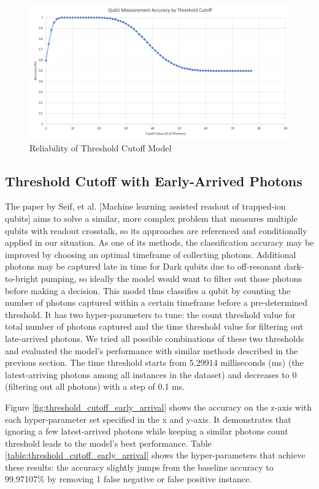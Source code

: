 \documentclass[letterpaper,twocolumn,10pt]{article}
\begin{document}
\begin{figure}
    \includegraphics[width=\linewidth]{Figures/threshold_cutoff_accuracy.png}
    \centering
    \caption{Reliability of Threshold Cutoff Model}
    \label{fig:threshold_cutoff}
\end{figure}

\subsection{Threshold Cutoff with Early-Arrived Photons}

The paper by Seif, et al. [Machine learning assisted readout of trapped-ion qubits] aims to solve a similar, more complex problem that measures multiple qubits with readout crosstalk, so its approaches are referenced and conditionally applied in our situation. As one of its methods, the classification accuracy may be improved by choosing an optimal timeframe of collecting photons. Additional photons may be captured late in time for Dark qubits due to off-resonant dark-to-bright pumping, so ideally the model would want to filter out those photons before making a decision. This model thus classifies a qubit by counting the number of photons captured within a certain timeframe before a pre-determined threshold. It has two hyper-parameters to tune: the count threshold value for total number of photons captured and the time threshold value for filtering out late-arrived photons. We tried all possible combinations of these two thresholds and evaluated the model's performance with similar methods described in the previous section. The time threshold starts from 5.29914 milliseconds (ms) (the latest-arriving photons among all instances in the dataset) and decreases to 0 (filtering out all photons) with a step of 0.1 ms.

Figure \ref{fig:threshold_cutoff_early_arrival} shows the accuracy on the z-axis with each hyper-parameter set specified in the x and y-axis. It demonstrates that ignoring a few latest-arrived photons while keeping a similar photons count threshold leads to the model's best performance. Table \ref{table:threshold_cutoff_early_arrival} shows the hyper-parameters that achieve these results: the accuracy slightly jumps from the baseline accuracy to 99.97107\% by removing 1 false negative or false positive instance.
\end{document}
